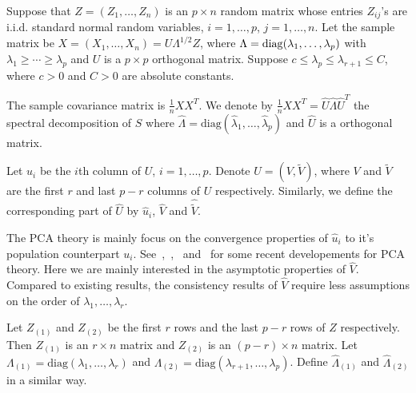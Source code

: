 \begin{assumption}\label{PCAassump}
    Suppose that $Z=(Z_1,\ldots,Z_n)$ is an $p\times n$ random matrix whose entries $Z_{ij}$'s are i.i.d. standard normal random variables, $ i=1,\ldots, p$, $j=1,\ldots, n$.
    Let the sample matrix be $X=(X_1,\ldots,X_n)=U\Lambda^{1/2}Z$, where $\Lambda=\operatorname{diag}(\lambda_1,\ldots,\lambda_p)$ with $\lambda_1\geq\cdots\geq \lambda_p$ and $U$ is a $p\times p$ orthogonal matrix.
    Suppose  $c\leq \lambda_{p} \leq \lambda_{r+1}\leq C$, where $c>0$ and $C>0$ are absolute constants. 
\end{assumption}
    The sample covariance matrix is $\frac{1}{n}X X^T$.
    We denote by  $\frac{1}{n}X X^T=\hat{U}\hat{\Lambda}\hat{U}^T$ the spectral decomposition of $S$ where $\hat{\Lambda}=\mathrm{diag}(\hat{\lambda}_1,\ldots,\hat{\lambda}_p)$ and $\hat{U}$ is a orthogonal matrix.
    
    Let $u_i$ be the $i$th column of $U$, $i=1,\ldots, p$. Denote $U=(V,\tilde{V})$, where $V$ and $\tilde{V}$ are the first $r$ and last $p-r$ columns of $U$ respectively. Similarly, we define the corresponding part of $\hat{U}$ by $\hat{u}_i$, $\hat{V}$ and $\hat{\tilde{V}}$.

    The PCA theory is mainly focus on the convergence properties of $\hat{u}_i$ to it's population counterpart $u_i$.
    See~\cite{Jung2009PCA},~\cite{2012arXiv1211.2671S},~\cite{Shen2013Consistency} and~\cite{Fan2015Asymptotics} for some recent developements for PCA theory.
    Here we are mainly interested in the asymptotic properties of $\hat{V}$.
    Compared to existing results, the consistency results of $\hat{V}$ require less assumptions on the order of $\lambda_1,\ldots,\lambda_r$.

    Let $Z_{(1)}$ and $Z_{(2)}$ be the first $r$ rows and the last $p-r$ rows of $Z$ respectively. Then $Z_{(1)}$ is an $r\times n$ matrix and $Z_{(2)}$ is an $(p-r)\times n$ matrix.
    Let $\Lambda_{(1)}=\mathrm{diag}(\lambda_1,\ldots,\lambda_r)$ and $\Lambda_{(2)}=\mathrm{diag}(\lambda_{r+1},\ldots,\lambda_p)$.
    Define $\hat{\Lambda}_{(1)}$ and $\hat{\Lambda}_{(2)}$ in a similar way.


